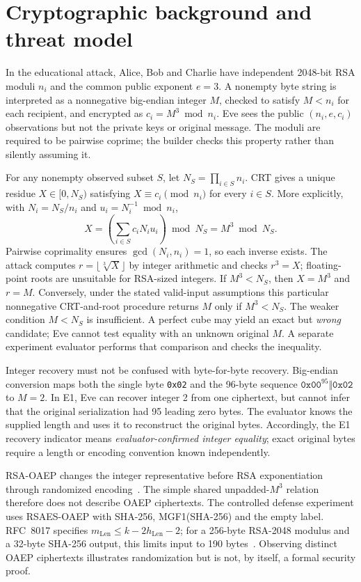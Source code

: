 \section{Cryptographic background and threat model}
In the educational attack, Alice, Bob and Charlie have independent 2048-bit RSA moduli $n_i$ and the common public exponent $e=3$. A nonempty byte string is interpreted as a nonnegative big-endian integer $M$, checked to satisfy $M<n_i$ for each recipient, and encrypted as $c_i=M^3\bmod n_i$. Eve sees the public $(n_i,e,c_i)$ observations but not the private keys or original message. The moduli are required to be pairwise coprime; the builder checks this property rather than silently assuming it.

For any nonempty observed subset $S$, let $N_S=\prod_{i\in S}n_i$. CRT gives a unique residue $X\in[0,N_S)$ satisfying $X\equiv c_i\pmod{n_i}$ for every $i\in S$. More explicitly, with $N_i=N_S/n_i$ and $u_i=N_i^{-1}\bmod n_i$,
\begin{equation}\label{eq:crt}
X=\left(\sum_{i\in S} c_i N_i u_i\right)\bmod N_S
  = M^3\bmod N_S .
\end{equation}
Pairwise coprimality ensures $\gcd(N_i,n_i)=1$, so each inverse exists. The attack computes $r=\lfloor\sqrt[3]{X}\rfloor$ by integer arithmetic and checks $r^3=X$; floating-point roots are unsuitable for RSA-sized integers. If $M^3<N_S$, then $X=M^3$ and $r=M$. Conversely, under the stated valid-input assumptions this particular nonnegative CRT-and-root procedure returns $M$ only if $M^3<N_S$. The weaker condition $M<N_S$ is insufficient. A perfect cube may yield an exact but \emph{wrong} candidate; Eve cannot test equality with an unknown original $M$. A separate experiment evaluator performs that comparison and checks the inequality.

Integer recovery must not be confused with byte-for-byte recovery. Big-endian conversion maps both the single byte \texttt{0x02} and the 96-byte sequence $\texttt{0x00}^{95}\Vert\texttt{0x02}$ to $M=2$. In E1, Eve can recover integer 2 from one ciphertext, but cannot infer that the original serialization had 95 leading zero bytes. The evaluator knows the supplied length and uses it to reconstruct the original bytes. Accordingly, the E1 recovery indicator means \emph{evaluator-confirmed integer equality}; exact original bytes require a length or encoding convention known independently.

RSA-OAEP changes the integer representative before RSA exponentiation through randomized encoding~\cite{bellare1995optimal,moriarty2016pkcs1}. The simple shared unpadded-$M^3$ relation therefore does not describe OAEP ciphertexts. The controlled defense experiment uses RSAES-OAEP with SHA-256, MGF1(SHA-256) and the empty label. RFC~8017 specifies $m_{\mathrm{Len}}\leq k-2h_{\mathrm{Len}}-2$; for a 256-byte RSA-2048 modulus and a 32-byte SHA-256 output, this limits input to 190 bytes~\cite{moriarty2016pkcs1}. Observing distinct OAEP ciphertexts illustrates randomization but is not, by itself, a formal security proof.
